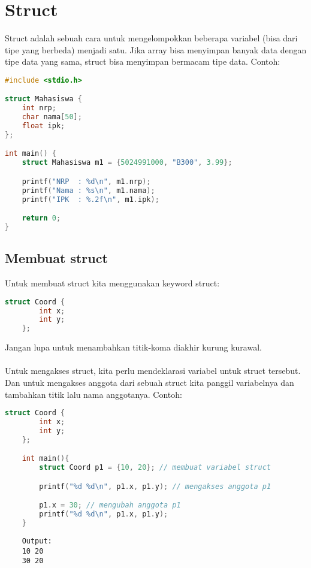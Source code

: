 \section{Struct}

Struct adalah sebuah cara untuk mengelompokkan beberapa variabel (bisa dari tipe yang berbeda) menjadi satu.
Jika array bisa menyimpan banyak data dengan tipe data yang sama, struct bisa menyimpan bermacam tipe data.
Contoh:
\begin{lstlisting}[language=c]
#include <stdio.h>

struct Mahasiswa {
	int nrp;
	char nama[50];
	float ipk;
};

int main() {
	struct Mahasiswa m1 = {5024991000, "B300", 3.99};

	printf("NRP  : %d\n", m1.nrp);
	printf("Nama : %s\n", m1.nama);
	printf("IPK  : %.2f\n", m1.ipk);

	return 0;
}
\end{lstlisting}

\subsection{Membuat struct}

Untuk membuat struct kita menggunakan keyword struct:
{
\captionsetup[lstlisting]{labelformat=empty, justification=raggedright, singlelinecheck=false} %
\begin{lstlisting}[language=c, caption={syntax}]
	struct Coord {
		int x;
		int y;
	};
\end{lstlisting}
}
Jangan lupa untuk menambahkan titik-koma diakhir kurung kurawal.\\\\
Untuk mengakses struct, kita perlu mendeklarasi variabel untuk struct tersebut.
Dan untuk mengakses anggota dari sebuah struct kita panggil variabelnya dan tambahkan titik lalu nama anggotanya.
Contoh:
\begin{lstlisting}[language=c]
	struct Coord {
		int x;
		int y;
	};

	int main(){
		struct Coord p1 = {10, 20}; // membuat variabel struct

		printf("%d %d\n", p1.x, p1.y); // mengakses anggota p1

		p1.x = 30; // mengubah anggota p1
		printf("%d %d\n", p1.x, p1.y);
	}    
\end{lstlisting}
\begin{verbatim}
    Output:
    10 20
    30 20    
\end{verbatim}

